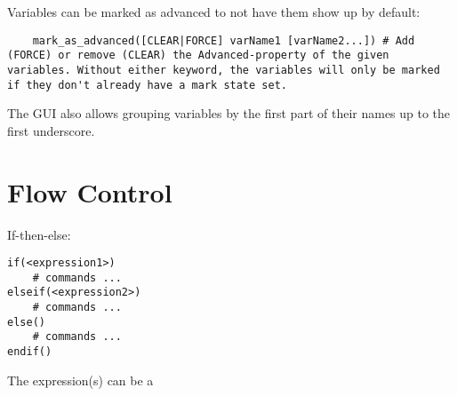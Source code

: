 \documentclass[8pt, table, xcdraw]{article}%
\begin{document}
\begin{itemize}
    Variables can be marked as advanced to not have them show up by default:
    
    \begin{lstlisting}
    mark_as_advanced([CLEAR|FORCE] varName1 [varName2...]) # Add (FORCE) or remove (CLEAR) the Advanced-property of the given variables. Without either keyword, the variables will only be marked if they don't already have a mark state set.
    \end{lstlisting}
    
    The GUI also allows grouping variables by the first part of their names up to the first underscore.
\end{itemize}

\section{Flow Control}

If-then-else:

\begin{lstlisting}
if(<expression1>)
    # commands ...
elseif(<expression2>)
    # commands ...
else()
    # commands ...
endif()
\end{lstlisting}

The expression(s) can be a
\end{document}
